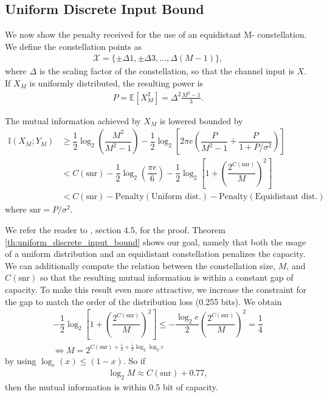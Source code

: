 \subsection{Uniform Discrete Input Bound}
We now show the penalty received for the use of an equidistant M- constellation. We define the constellation points as
\begin{align}
	\mathcal{X} = \{\pm\Delta 1, \pm\Delta 3,\dots, \Delta(M-1)\},
\end{align}
where $\Delta$ is the scaling factor of the constellation, so that the channel input is $X$. If $X_M$ is uniformly distributed, the resulting power  is
\begin{align}
	P = \mathbb{E}\left[X_{M}^2\right] = \Delta^2\frac{M^2 - 1}{3}.
\end{align}
\begin{theorem}
\label{th:uniform_discrete_input_bound}
The mutual information achieved by $X_M$ is lowered bounded by
\begin{align}
\mathbb{I}(X_M;Y_M) &\geq \dfrac{1}{2} \log_2 \left( \dfrac{M^2}{M^2 -1}\right) - \dfrac{1}{2} \log_2 \left[2\pi e\left( \dfrac{P}{M^2 -1}+ \dfrac{P}{1+P/\sigma^2}\right)\right]\\
& < C(\text{snr}) - \dfrac{1}{2} \log_{2} \left(\dfrac{\pi e}{6}\right) - \dfrac{1}{2} \log_2 \left[1 +\left(\dfrac{2^{C(\text{snr})}}{M}\right)^2\right]\\
& < C(\text{snr}) - \text{Penalty}(\text{Uniform dist.}) - \text{Penalty}(\text{Equidistant dist.})
\end{align}
where $\text{snr} = P/\sigma^2$.
\end{theorem}
We refer the reader to \cite{Boecherer_CM}, section 4.5, for the proof.
Theorem \ref{th:uniform_discrete_input_bound} shows our goal, namely that both the usage of a uniform distribution and an equidistant constellation penalizes the capacity. We can additionally compute the relation between the constellation size, $M$, and $C(\text{snr})$ so that the resulting mutual information is within a constant gap of capacity. To make this result even more attractive, we increase the constraint for the gap to match the order of the distribution loss (0.255 bits). We obtain
\begin{align}
	- \dfrac{1}{2} \log_2 \left[1 +\left(\dfrac{2^{C(\text{snr})}}{M}\right)^2\right] \leq - \dfrac{\log_2 e}{2} \left(\dfrac{2^{C(\text{snr})}}{M}\right)^2 = \dfrac{1}{4}\\
	\Leftrightarrow M = 2^{C(\text{snr}) + \tfrac{1}{2}+\tfrac{1}{2} \log_2 \log_2 e}
\end{align}
by using $\log_e(x)\leq (1-x)$. So if 
\begin{align}
	\log_2 M \approx C(\text{snr}) +0.77,
\end{align}
then the mutual information is within 0.5 bit of capacity.

